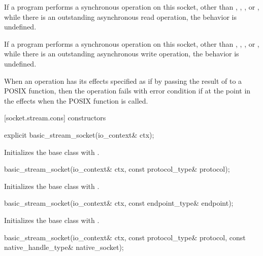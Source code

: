 \pnum
If a program performs a synchronous operation on this socket, other than , , , or , while there is an outstanding asynchronous read operation, the behavior is undefined.

\pnum
If a program performs a synchronous operation on this socket, other than , , , or , while there is an outstanding asynchronous write operation, the behavior is undefined.

\pnum
When an operation has its effects specified as if by passing the result of  to a POSIX function, then the operation fails with error condition  if  at the point in the effects when the POSIX function is called.


[socket.stream.cons]{ constructors}

\begin{itemdecl}
explicit basic_stream_socket(io_context& ctx);
\end{itemdecl}

\begin{itemdescr}
\pnum
\effects Initializes the base class with .
\end{itemdescr}

\begin{itemdecl}
basic_stream_socket(io_context& ctx, const protocol_type& protocol);
\end{itemdecl}

\begin{itemdescr}
\pnum
\effects Initializes the base class with .
\end{itemdescr}

\begin{itemdecl}
basic_stream_socket(io_context& ctx, const endpoint_type& endpoint);
\end{itemdecl}

\begin{itemdescr}
\pnum
\effects Initializes the base class with .
\end{itemdescr}

\begin{itemdecl}
basic_stream_socket(io_context& ctx, const protocol_type& protocol,
                      const native_handle_type& native_socket);
\end{itemdecl}

